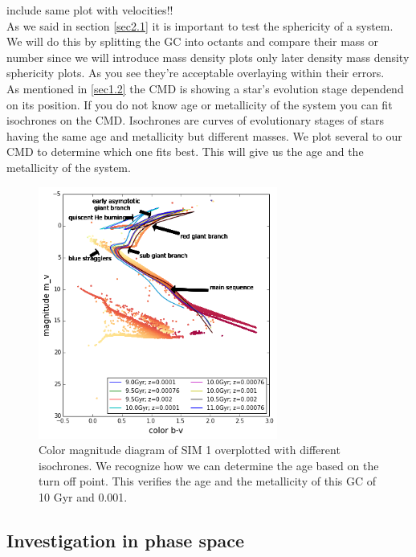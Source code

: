 \color{red} include same plot with velocities!! \color{black}\\
As we said in section \ref{sec2.1} it is important to test the sphericity of a system. We will do this by splitting the \ac{GC} into octants and compare their mass \color{red} or number since we will introduce mass density plots only later \color{black} density \color{red} mass density sphericity plots\color{black}. As you see they're acceptable overlaying \color{red} within their errors. \color{black}
\\
As mentioned in \ref{sec1.2} the \ac{CMD} is showing a star's evolution stage dependend on its position. If you do not know age or metallicity of the system you can fit isochrones on the \ac{CMD}. Isochrones are curves of evolutionary stages of stars having the same age and metallicity but different masses. We plot several to our \ac{CMD} to determine which one fits best. This will give us the age and the metallicity of the system. 
\begin{figure}
	\centering
	\includegraphics[width=0.7\textwidth]{Plots/cmd_isochrones.pdf}
	\caption{Color magnitude diagram of SIM 1 overplotted with different isochrones. We recognize how we can determine the age based on the turn off point. This verifies the age and the metallicity of this \ac{GC} of 10 Gyr and 0.001.}
	\label{fig:cmd_isochrones}
\end{figure}


\subsection{Investigation in phase space}

